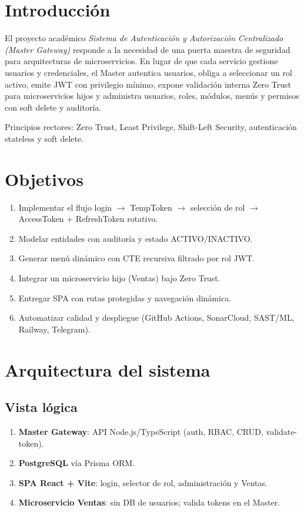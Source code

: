 %   

\section{Introducción}
El proyecto académico \emph{Sistema de Autenticación y Autorización Centralizado
(Master Gateway)} responde a la necesidad de una puerta maestra de seguridad
para arquitecturas de microservicios. En lugar de que cada servicio gestione
usuarios y credenciales, el Master autentica usuarios, obliga a seleccionar un
rol activo, emite JWT con privilegio mínimo, expone validación interna Zero Trust
para microservicios hijos y administra usuarios, roles, módulos, menús y permisos
con soft delete y auditoría.

Principios rectores: Zero Trust, Least Privilege, Shift-Left Security,
autenticación stateless y soft delete.

\section{Objetivos}
\begin{enumerate}
  \item Implementar el flujo login $\rightarrow$ TempToken $\rightarrow$ selección de rol
        $\rightarrow$ AccessToken + RefreshToken rotativo.
  \item Modelar entidades con auditoría y estado ACTIVO/INACTIVO.
  \item Generar menú dinámico con CTE recursiva filtrado por rol JWT.
  \item Integrar un microservicio hijo (Ventas) bajo Zero Trust.
  \item Entregar SPA con rutas protegidas y navegación dinámica.
  \item Automatizar calidad y despliegue (GitHub Actions, SonarCloud, SAST/ML, Railway, Telegram).
\end{enumerate}

\section{Arquitectura del sistema}
\subsection{Vista lógica}
\begin{enumerate}
  \item \textbf{Master Gateway}: API Node.js/TypeScript (auth, RBAC, CRUD, validate-token).
  \item \textbf{PostgreSQL} vía Prisma ORM.
  \item \textbf{SPA React + Vite}: login, selector de rol, administración y Ventas.
  \item \textbf{Microservicio Ventas}: sin DB de usuarios; valida tokens en el Master.
\end{enumerate}

